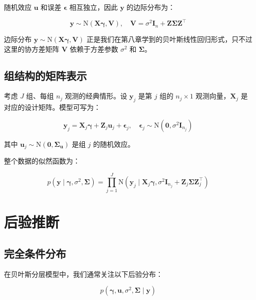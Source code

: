 随机效应 $\mathbf{u}$ 和误差 $\boldsymbol{\epsilon}$ 相互独立，因此 $\mathbf{y}$ 的边际分布为：

\[
\mathbf{y} \sim \mathrm{N}(\mathbf{X}\boldsymbol{\gamma}, \mathbf{V}), \quad \mathbf{V} = \sigma^2 \mathbf{I}_n + \mathbf{Z}\boldsymbol{\Sigma}\mathbf{Z}^\top
\]

\begin{Remark}
边际分布 $\mathbf{y} \sim \mathrm{N}(\mathbf{X}\boldsymbol{\gamma}, \mathbf{V})$ 正是我们在第八章学到的贝叶斯线性回归形式，只不过这里的协方差矩阵 $\mathbf{V}$ 依赖于方差参数 $\sigma^2$ 和 $\boldsymbol{\Sigma}$。
\end{Remark}

\subsection{组结构的矩阵表示}
\label{sec:group-structure}

考虑 $J$ 组、每组 $n_j$ 观测的经典情形。设 $\mathbf{y}_j$ 是第 $j$ 组的 $n_j \times 1$ 观测向量，$\mathbf{X}_j$ 是对应的设计矩阵。模型可写为：

\[
\mathbf{y}_j = \mathbf{X}_j \boldsymbol{\gamma} + \mathbf{Z}_j \mathbf{u}_j + \boldsymbol{\epsilon}_j, \quad \boldsymbol{\epsilon}_j \sim \mathrm{N}(\mathbf{0}, \sigma^2 \mathbf{I}_{n_j})
\]

其中 $\mathbf{u}_j \sim \mathrm{N}(\mathbf{0}, \boldsymbol{\Sigma}_\mathbf{u})$ 是组 $j$ 的随机效应。

整个数据的似然函数为：

\[
p(\mathbf{y} \mid \boldsymbol{\gamma}, \sigma^2, \boldsymbol{\Sigma}) = \prod_{j=1}^J \mathrm{N}\left(\mathbf{y}_j \mid \mathbf{X}_j\boldsymbol{\gamma}, \sigma^2 \mathbf{I}_{n_j} + \mathbf{Z}_j \boldsymbol{\Sigma} \mathbf{Z}_j^\top\right)
\]

\section{后验推断}
\label{sec:posterior-inference-hlm}

\subsection{完全条件分布}
\label{sec:full-conditional}

在贝叶斯分层模型中，我们通常关注以下后验分布：

\[
p(\boldsymbol{\gamma}, \mathbf{u}, \sigma^2, \boldsymbol{\Sigma} \mid \mathbf{y})
\]

